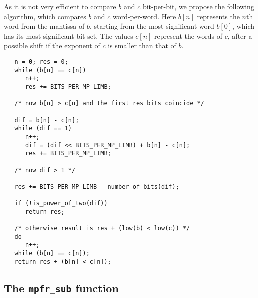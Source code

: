 \documentclass[12pt]{amsart}
\begin{document}
As it is not very efficient to compare $b$ and $c$ bit-per-bit, we propose
the following algorithm, which compares $b$ and $c$ word-per-word.
Here $b[n]$ represents the $n$th word from the mantissa of $b$, starting from
the most significant word $b[0]$, which has its most significant bit set.
The values $c[n]$ represent the words of $c$, after a possible shift if the
exponent of $c$ is smaller than that of $b$.
\begin{verbatim}
   n = 0; res = 0;
   while (b[n] == c[n])
      n++;
      res += BITS_PER_MP_LIMB;

   /* now b[n] > c[n] and the first res bits coincide */

   dif = b[n] - c[n];
   while (dif == 1)
      n++;
      dif = (dif << BITS_PER_MP_LIMB) + b[n] - c[n];
      res += BITS_PER_MP_LIMB;

   /* now dif > 1 */

   res += BITS_PER_MP_LIMB - number_of_bits(dif);

   if (!is_power_of_two(dif))
      return res;

   /* otherwise result is res + (low(b) < low(c)) */
   do
      n++;
   while (b[n] == c[n]);
   return res + (b[n] < c[n]);
\end{verbatim}

\subsection{The {\tt mpfr\_sub} function}
\end{document}
